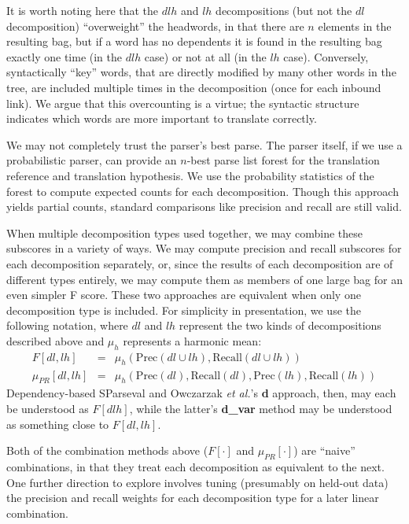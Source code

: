 \documentclass{kluwer}    %
\newcommand{\precision}[1]{\ensuremath{\textrm{Prec}\left(#1\right)}}
\newcommand{\recall}[1]{\ensuremath{\textrm{Recall}\left(#1\right)}}
\begin{document}
\begin{article}
It is worth noting here that the $dlh$ and $lh$ decompositions (but
not the $dl$ decomposition) ``overweight'' the headwords, in that
there are $n$ elements in the resulting bag, but if a word has no
dependents it is found in the resulting bag exactly one time (in the
$dlh$ case) or not at all (in the $lh$ case).  Conversely,
syntactically ``key'' words, that are directly modified by many other
words in the tree, are included multiple times in the decomposition
(once for each inbound link).  We argue that this overcounting is a
virtue; the syntactic structure indicates which words are more
important to translate correctly.

We may not completely trust the parser's best parse.  The parser
itself, if we use a probabilistic parser, can provide an $n$-best
parse list forest for the translation reference and translation
hypothesis. We use the probability statistics of the forest to compute
expected counts for each decomposition. Though this approach yields
partial counts, standard comparisons like precision and recall are
still valid.

When multiple decomposition types used together, we may combine these
subscores in a variety of ways.  We may compute precision and recall
subscores for each decomposition separately, or, since the results of
each decomposition are of different types entirely, we may compute
them as members of one large bag for an even simpler F score.  These
two approaches are equivalent when only one decomposition type is
included.  For simplicity in presentation, we use the following
notation, where $dl$ and $lh$ represent the two kinds of
decompositions described above and $\mu_h$ represents a harmonic mean:
\begin{eqnarray}
  \label{eq:fprmeans}
  F[dl,lh] & = &
  \mu_h \left( \precision{dl \cup lh},
    \recall{dl \cup lh} \right) \\
  \mu_{PR}[dl,lh]  & = & \mu_h \left( \precision{dl},
    \recall{dl}, \precision{lh}, \recall{lh} \right)    
\end{eqnarray}
Dependency-based SParseval and Owczarzak \textit{et al.}'s
\cite*{owczarzak07labelleddepseval} \textbf{d} approach, then, may
each be understood as $F[dlh]$, while the latter's \textbf{d\_var}
method may be understood as something close to $F[dl,lh]$.

Both of the combination methods above ($F[\cdot]$ and
$\mu_{PR}[\cdot]$) are ``naive'' combinations, in that they treat each
decomposition as equivalent to the next.  One further direction to
explore involves tuning (presumably on held-out data) the precision
and recall weights for each decomposition type for a later linear
combination.


\end{article}
\end{document}
